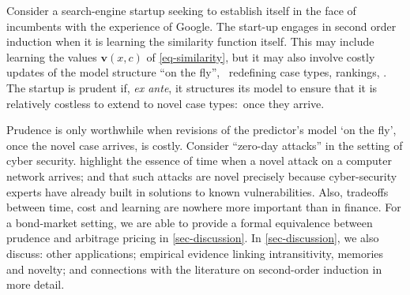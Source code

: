 \documentclass[12pt,a4paper,twoside]{article}
\begin{document}
\begin{example}\label{eg-second-order}
  Consider a search-engine startup seeking to establish itself in the face of
  incumbents with the experience of Google. The start-up engages in second order
  induction when it is learning the similarity function itself. This may include
  learning the values $\mathbf{v}(x,c)$ of \cref{eq-similarity}, but it may
  also involve costly updates of the model structure ``on the fly'', \eg\
  redefining case types, rankings, \etc. The startup is prudent if, \emph{ex
    ante}, it structures its model to ensure that it is relatively costless to
  extend to novel case types$:$ once they arrive.
\end{example}

Prudence is only worthwhile when revisions of the predictor's model `on the fly',
once the novel case arrives, is costly.  %
Consider ``zero-day attacks'' in the setting of cyber security.
 highlight the essence of time when a novel
attack on a computer network arrives; and that such attacks are novel precisely
because cyber-security experts have already built in solutions to known
vulnerabilities. Also, tradeoffs between time, cost and learning are nowhere
more important than in finance. For a bond-market setting, we are able to
provide a formal equivalence between prudence and arbitrage pricing in
\cref{sec-discussion}.  In \cref{sec-discussion}, we also discuss: other
applications; empirical evidence linking intransitivity, memories and novelty;
and connections with the literature on second-order induction in more detail.



\end{document}
